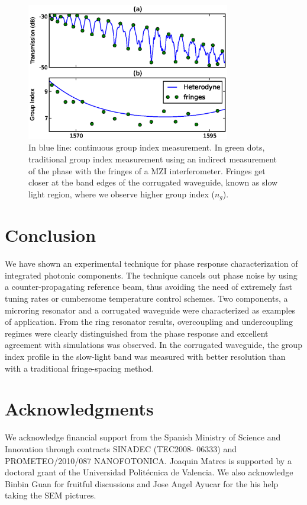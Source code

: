 \documentclass[journal]{IEEEtran}
\begin{document}
\begin{figure}[htb]
  \centering
  \includegraphics[width=3.5in]{gropIndexComparison_2}
  \caption{In blue line: continuous group index measurement. In green dots, traditional group index measurement using an indirect measurement of the phase with the fringes of a MZI interferometer. Fringes get closer at the band edges of the corrugated waveguide, known as slow light region, where we observe higher group index ($n_g$).} %
  \label{fig:groupIndex}
\end{figure}



\section{Conclusion}
We have shown an experimental technique for phase response characterization of integrated photonic components. The technique cancels out phase noise by using a counter-propagating reference beam, thus avoiding the need of extremely fast tuning rates or cumbersome temperature control schemes. Two components, a microring resonator and a corrugated waveguide were characterized as examples of application. From the ring resonator results, overcoupling and undercoupling regimes were clearly distinguished from the phase response and excellent agreement with simulations was observed. In the corrugated waveguide, the group index profile in the slow-light band was measured with better resolution than with a traditional fringe-spacing method.


\section*{Acknowledgments}
We acknowledge financial support from the Spanish Ministry of Science and Innovation through contracts SINADEC (TEC2008- 06333) and PROMETEO/2010/087 NANOFOTONICA. Joaquin Matres is supported by a doctoral grant of the Universidad Polit\'ecnica de Valencia. We also acknowledge Binbin Guan for fruitful discussions and Jose Angel Ayucar for the his help taking the SEM pictures.
\end{document}
